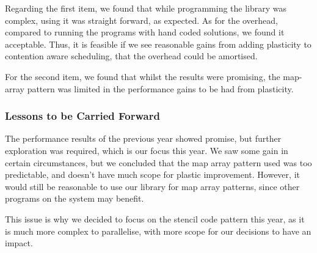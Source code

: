 Regarding the first item, we found that while programming the library was complex, using it was straight forward, as expected. As for the overhead, compared to running the programs with hand coded solutions, we found it acceptable. Thus, it is feasible if we see reasonable gains from adding plasticity to contention aware scheduling, that the overhead could be amortised.

For the second item, we found that whilst the results were promising, the map-array pattern was limited in the performance gains to be had from plasticity.



\subsubsection{Lessons to be Carried Forward}
\label{section:background:lessons_to_be_carried_forward}

The performance results of the previous year showed promise, but further exploration was required, which is our focus this year. We saw some gain in certain circumstances, but we concluded that the map array pattern used was too predictable, and doesn't have much scope for plastic improvement. However, it would still be reasonable to use our library for map array patterns, since other programs on the system may benefit.

This issue is why we decided to focus on the stencil code pattern this year, as it is much more complex to parallelise, with more scope for our decisions to have an impact.